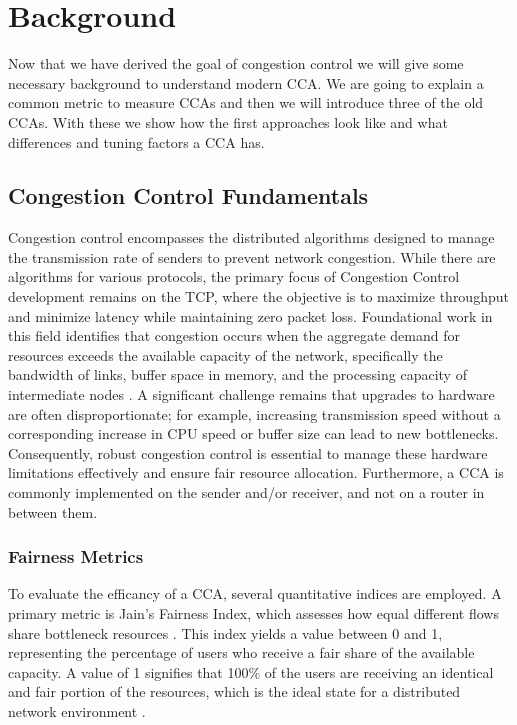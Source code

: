 \section{Background}\label{sec:Background}

Now that we have derived the goal of congestion control we will give some necessary background to understand modern \acs{CCA}.
We are going to explain a common metric to measure \ac{CCA}s and then we will introduce three of the old \ac{CCA}s. 
With these we show how the first approaches look like and what differences and tuning factors a \ac{CCA} has.

\subsection{Congestion Control Fundamentals}

Congestion control encompasses the distributed algorithms designed to manage the transmission rate of senders to prevent network congestion. 
While there are algorithms for various protocols, the primary focus of Congestion Control development remains on the \ac{TCP}, where the objective is to maximize throughput and minimize latency while maintaining zero packet loss. 
Foundational work in this field identifies that congestion occurs when the aggregate demand for resources exceeds the available capacity of the network, specifically the bandwidth of links, buffer space in memory, and the processing capacity of intermediate nodes \cite{JainsCongestionControl}. 
A significant challenge remains that upgrades to hardware are often disproportionate; for example, increasing transmission speed without a corresponding increase in CPU speed or buffer size can lead to new bottlenecks. 
Consequently, robust congestion control is essential to manage these hardware limitations effectively and ensure fair resource allocation.
Furthermore, a \ac{CCA} is commonly implemented on the sender and/or receiver, and not on a router in between them.

\subsubsection*{Fairness Metrics}

To evaluate the efficancy of a \acs{CCA}, several quantitative indices are employed. 
A primary metric is Jain's Fairness Index, which assesses how equal different flows share bottleneck resources \cite{JainsIndex}. 
This index yields a value between 0 and 1, representing the percentage of users who receive a fair share of the available capacity.
A value of 1 signifies that 100\% of the users are receiving an identical and fair portion of the resources, which is the ideal state for a distributed network environment \cite{JainsIndex}.

